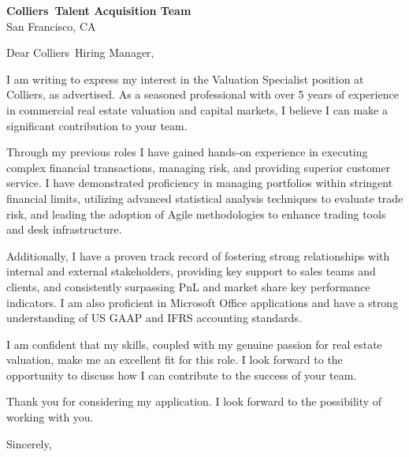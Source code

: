 \documentclass{letter}
\newcommand{\company}{Colliers}
\begin{document}
\begin{letter}{\textbf{\company\ Talent Acquisition Team} \\                
    San Francisco, CA }

\opening{Dear \company\ Hiring Manager,}

I am writing to express my interest in the Valuation Specialist position at Colliers, as advertised. As a seasoned professional with over 5 years of experience in commercial real estate valuation and capital markets, I believe I can make a significant contribution to your team.

Through my previous roles I have gained hands-on experience in executing complex financial transactions, managing risk, and providing superior customer service. I have demonstrated proficiency in managing portfolios within stringent financial limits, utilizing advanced statistical analysis techniques to evaluate trade risk, and leading the adoption of Agile methodologies to enhance trading tools and desk infrastructure.

Additionally, I have a proven track record of fostering strong relationships with internal and external stakeholders, providing key support to sales teams and clients, and consistently surpassing PnL and market share key performance indicators. I am also proficient in Microsoft Office applications and have a strong understanding of US GAAP and IFRS accounting standards.

I am confident that my skills, coupled with my genuine passion for real estate valuation, make me an excellent fit for this role. I look forward to the opportunity to discuss how I can contribute to the success of your team.

Thank you for considering my application. I look forward to the possibility of working with you.



\closing{Sincerely,}

\end{letter}
\end{document}
